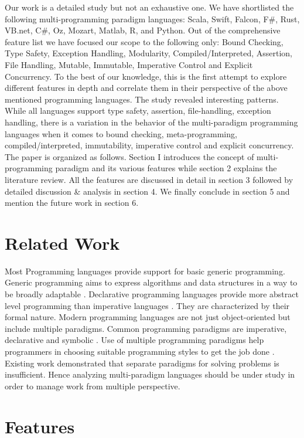\documentclass{sig-alternate}
\begin{document}
  Our work is a detailed study but not an exhaustive one. We have shortlisted the following multi-programming paradigm languages: Scala, Swift, Falcon, F\#, Rust, VB.net, C\#, Oz, Mozart, Matlab, R, and Python. Out of the comprehensive feature list we have focused our scope to the following only: Bound Checking, Type Safety, Exception Handling, Modularity, Compiled/Interpreted, Assertion, File Handling, Mutable, Immutable, Imperative Control and Explicit Concurrency. To the best of our knowledge, this is the first attempt to explore different features in depth and correlate them in their perspective of the above mentioned programming languages. The study revealed interesting patterns. While all languages support type safety, assertion, file-handling, exception handling, there is a variation in the behavior of the multi-paradigm programming languages when it comes to bound checking, meta-programming, compiled/interpreted, immutability, imperative control and explicit concurrency.\\
	The paper is organized as follows. Section I introduces the concept of multi-programming paradigm and its various features while section 2 explains the literature review. All the features are discussed in detail in section 3 followed by detailed discussion & analysis in section 4. We finally conclude in section 5 and mention the future work in section 6.\\
	
	\section{Related Work}
	Most Programming languages provide support for basic generic programming. Generic programming aims to express algorithms and data structures in a way to be broadly adaptable \cite{lr5}. Declarative programming languages provide more abstract level programming than imperative languages \cite{lr4}. They are characterized by their formal nature.  Modern programming languages are not just object-oriented but include multiple paradigms. Common programming paradigms are imperative, declarative and symbolic \cite{lr1}. Use of multiple programming paradigms help programmers in choosing suitable programming styles to get the job done \cite{lr2}. Existing work demonstrated that separate paradigms for solving problems is insufficient\cite{WinNT}. Hence analyzing multi-paradigm languages should be under study in order to manage work from multiple perspective. 
	
	\section{Features}
	
\end{document}
